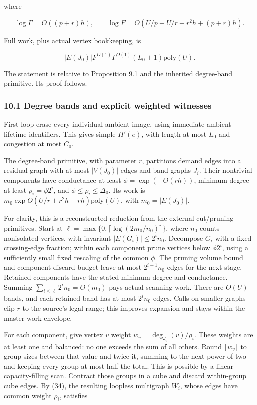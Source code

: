 where

\[
\log\Gamma=O((p+r)h),\qquad
 \log F=O(U/p+U/r+r^2h+(p+r)h).
 \tag{48}
\]

Full work, plus actual vertex bookkeeping, is

\[
|E(J_0)|F^{O(1)}\Gamma^{O(1)}(L_0+1)\mathrm{poly}(U).
 \tag{49}
\]

The statement is relative to Proposition 9.1 and the inherited degree-band primitive. Its proof follows.

\hypertarget{af-46593eb93e-degree-bands-and-explicit-weighted-witnesses}{%
\subsubsection{10.1 Degree bands and explicit weighted witnesses}\label{af-46593eb93e-degree-bands-and-explicit-weighted-witnesses}}

First loop-erase every individual ambient image, using immediate ambient lifetime identifiers. This gives simple \(\Pi'(e)\), with length at most \(L_0\) and congestion at most \(C_0\).

The degree-band primitive, with parameter \(r\), partitions demand edges into a residual graph with at most \(|V(J_0)|\) edges and band graphs \(J_i\). Their nontrivial components have conductance at least \(\phi=\exp(-O(rh))\), minimum degree at least \(\rho_i=\phi2^i\), and \(\phi\leq\rho_i\leq\Delta_0\). Its work is \(m_0\exp O(U/r+r^2h+rh)\mathrm{poly}(U)\), with \(m_0=|E(J_0)|\).

For clarity, this is a reconstructed reduction from the external cut/pruning primitives. Start at \(\ell=\max\{0,\lceil\log(2m_0/n_0)\rceil\}\), where \(n_0\) counts nonisolated vertices, with invariant \(|E(G_i)|\leq2^in_0\). Decompose \(G_i\) with a fixed crossing-edge fraction; within each component prune vertices below \(\phi2^i\), using a sufficiently small fixed rescaling of the common \(\phi\). The pruning volume bound and component discard budget leave at most \(2^{i-1}n_0\) edges for the next stage. Retained components have the stated minimum degree and conductance. Summing \(\sum_{i\leq\ell}2^in_0=O(m_0)\) pays actual scanning work. There are \(O(U)\) bands, and each retained band has at most \(2^in_0\) edges. Calls on smaller graphs clip \(r\) to the source's legal range; this improves expansion and stays within the master work envelope.

For each component, give vertex \(v\) weight \(w_v=\deg_{J_i}(v)/\rho_i\). These weights are at least one and balanced: no one exceeds the sum of all others. Round \(\lceil w_v\rceil\) to group sizes between that value and twice it, summing to the next power of two and keeping every group at most half the total. This is possible by a linear capacity-filling scan. Contract those groups in a cube and discard within-group cube edges. By (34), the resulting loopless multigraph \(W_i\), whose edges have common weight \(\rho_i\), satisfies

